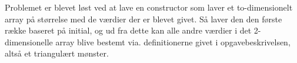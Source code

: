 Problemet er blevet løst ved at lave en constructor som laver et to-dimensionelt array på størrelse med de værdier der er blevet givet. Så laver den den første række baseret på initial, og ud fra dette kan alle andre værdier i det 2-dimensionelle array blive bestemt via. definitionerne givet i opgavebeskrivelsen, altså et triangulært mønster.